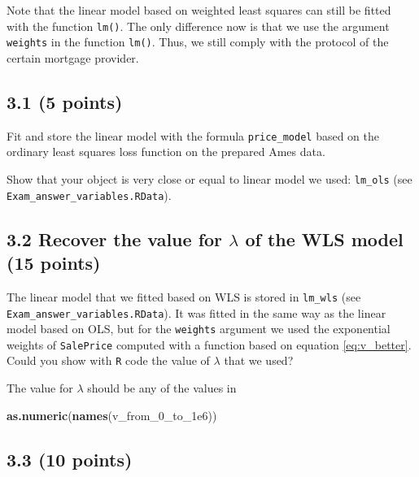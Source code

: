 \documentclass[]{article}
\newenvironment{Shaded}{\begin{snugshade}}{\end{snugshade}}
\newcommand{\KeywordTok}[1]{\textcolor[rgb]{0.13,0.29,0.53}{\textbf{#1}}}
\newcommand{\FloatTok}[1]{\textcolor[rgb]{0.00,0.00,0.81}{#1}}
\newcommand{\NormalTok}[1]{#1}
\begin{document}
Note that the linear model based on weighted least squares can still be
fitted with the function \texttt{lm()}. The only difference now is that
we use the argument \texttt{weights} in the function \texttt{lm()}.
Thus, we still comply with the protocol of the certain mortgage
provider.

\FloatBarrier 

\subsection{3.1 (5 points)}\label{points-3}

Fit and store the linear model with the formula \texttt{price\_model}
based on the ordinary least squares loss function on the prepared Ames
data.

Show that your object is very close or equal to linear model we used:
\texttt{lm\_ols} (see \texttt{Exam\_answer\_variables.RData}).

\subsection{\texorpdfstring{3.2 Recover the value for \(\lambda\) of the
WLS model (15
points)}{3.2 Recover the value for \textbackslash{}lambda of the WLS model (15 points)}}\label{recover-the-value-for-lambda-of-the-wls-model-15-points}

The linear model that we fitted based on WLS is stored in
\texttt{lm\_wls} (see \texttt{Exam\_answer\_variables.RData}). It was
fitted in the same way as the linear model based on OLS, but for the
\texttt{weights} argument we used the exponential weights of
\texttt{SalePrice} computed with a function based on equation
\eqref{eq:v_better}. Could you show with \texttt{R} code the value of
\(\lambda\) that we used?

The value for \(\lambda\) should be any of the values in

\begin{Shaded}
\begin{Highlighting}[]
\KeywordTok{as.numeric}\NormalTok{(}\KeywordTok{names}\NormalTok{(v_from_0_to_}\FloatTok{1e6}\NormalTok{))}
\end{Highlighting}
\end{Shaded}

\subsection{3.3 (10 points)}\label{points-4}
\end{document}
